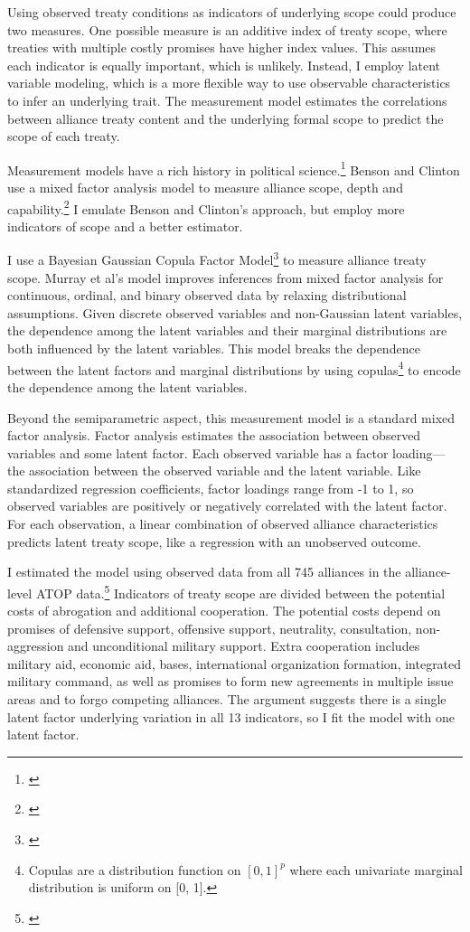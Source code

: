 \documentclass[12pt]{article}
\begin{document}
Using observed treaty conditions as indicators of underlying scope could produce two measures. 
One possible measure is an additive index of treaty scope, where treaties with multiple costly promises have higher index values. 
This assumes each indicator is equally important, which is unlikely. 
Instead, I employ latent variable modeling, which is a more flexible way to use observable characteristics to infer an underlying trait.  
The measurement model estimates the correlations between alliance treaty content and the underlying formal scope to predict the scope of each treaty. 


Measurement models have a rich history in political science.\footnote{\citep{Clintonetal2004, TreierJackman2008, Fariss2014}}
Benson and Clinton use a mixed factor analysis model to measure alliance scope, depth and capability.\footnote{\citep{BensonClinton2016, Quinn2004}} 
I emulate Benson and Clinton's approach, but employ more indicators of scope and a better estimator. 


I use a Bayesian Gaussian Copula Factor Model\footnote{\citep{Murrayetal2013}} to measure alliance treaty scope. 
Murray et al's model improves inferences from mixed factor analysis for continuous, ordinal, and binary observed data by relaxing distributional assumptions. 
Given discrete observed variables and non-Gaussian latent variables, the dependence among the latent variables and their marginal distributions are both influenced by the latent variables.
This model breaks the dependence between the latent factors and marginal distributions by using copulas\footnote{Copulas are a distribution function on $[0, 1]^p$ where each univariate marginal distribution is uniform on [0, 1].} to encode the dependence among the latent variables.


Beyond the semiparametric aspect, this measurement model is a standard mixed factor analysis.
Factor analysis estimates the association between observed variables and some latent factor.
Each observed variable has a factor loading--- the association between the observed variable and the latent variable.  
Like standardized regression coefficients, factor loadings range from -1 to 1, so observed variables are positively or negatively correlated with the latent factor.  
For each observation, a linear combination of observed alliance characteristics predicts latent treaty scope, like a regression with an unobserved outcome.  


I estimated the model using observed data from all 745 alliances in the alliance-level ATOP data.\footnote{\citep{Leedsetal2002}}
Indicators of treaty scope are divided between the potential costs of abrogation and additional cooperation.
The potential costs depend on promises of defensive support, offensive support, neutrality, consultation, non-aggression and unconditional military support. 
Extra cooperation includes military aid, economic aid, bases, international organization formation, integrated military command, as well as promises to form new agreements in multiple issue areas and to forgo competing alliances. 
The argument suggests there is a single latent factor underlying variation in all 13 indicators, so I fit the model with one latent factor. 
\end{document}
